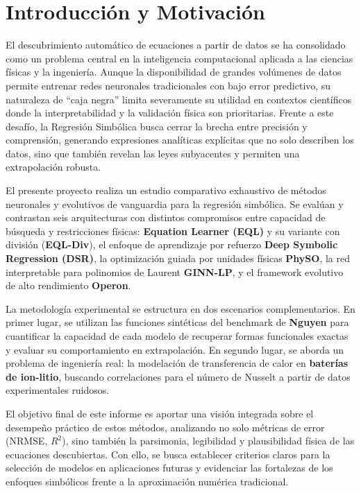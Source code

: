 \section{Introducción y Motivación}

El descubrimiento automático de ecuaciones a partir de datos se ha consolidado como un problema central en la inteligencia computacional aplicada a las ciencias físicas y la ingeniería. Aunque la disponibilidad de grandes volúmenes de datos permite entrenar redes neuronales tradicionales con bajo error predictivo, su naturaleza de ``caja negra'' limita severamente su utilidad en contextos científicos donde la interpretabilidad y la validación física son prioritarias. Frente a este desafío, la Regresión Simbólica busca cerrar la brecha entre precisión y comprensión, generando expresiones analíticas explícitas que no solo describen los datos, sino que también revelan las leyes subyacentes y permiten una extrapolación robusta.

El presente proyecto realiza un estudio comparativo exhaustivo de métodos neuronales y evolutivos de vanguardia para la regresión simbólica. Se evalúan y contrastan seis arquitecturas con distintos compromisos entre capacidad de búsqueda y restricciones físicas: \textbf{Equation Learner (EQL)} y su variante con división (\textbf{EQL-Div}), el enfoque de aprendizaje por refuerzo \textbf{Deep Symbolic Regression (DSR)}, la optimización guiada por unidades físicas \textbf{PhySO}, la red interpretable para polinomios de Laurent \textbf{GINN-LP}, y el framework evolutivo de alto rendimiento \textbf{Operon}.

La metodología experimental se estructura en dos escenarios complementarios. En primer lugar, se utilizan las funciones sintéticas del benchmark de \textbf{Nguyen} para cuantificar la capacidad de cada modelo de recuperar formas funcionales exactas y evaluar su comportamiento en extrapolación. En segundo lugar, se aborda un problema de ingeniería real: la modelación de transferencia de calor en \textbf{baterías de ion-litio}, buscando correlaciones para el número de Nusselt a partir de datos experimentales ruidosos.

El objetivo final de este informe es aportar una visión integrada sobre el desempeño práctico de estos métodos, analizando no solo métricas de error (NRMSE, $R^2$), sino también la parsimonia, legibilidad y plausibilidad física de las ecuaciones descubiertas. Con ello, se busca establecer criterios claros para la selección de modelos en aplicaciones futuras y evidenciar las fortalezas de los enfoques simbólicos frente a la aproximación numérica tradicional.





